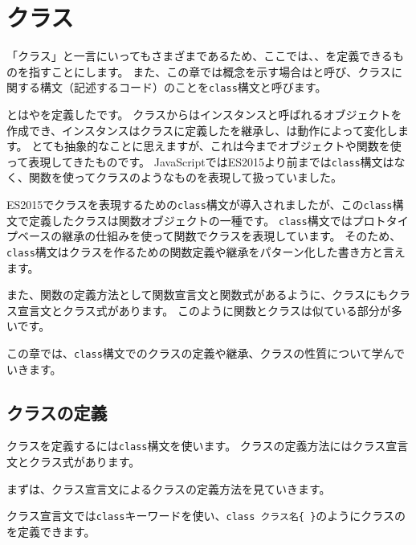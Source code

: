 \hypertarget{class}{%
\chapter{クラス}\label{class}}
\thispagestyle{frontheadings}

「クラス」と一言にいってもさまざまであるため、ここでは\textbf{}、\textbf{}、\textbf{}を定義できるものを指すことにします。
また、この章では概念を示す場合は\textbf{}と呼び、クラスに関する構文（記述するコード）のことを\texttt{class}構文と呼びます。

\textbf{}とは\textbf{}や\textbf{}を定義した\textbf{}です。
クラスからはインスタンスと呼ばれるオブジェクトを作成でき、インスタンスはクラスに定義した\textbf{}を継承し、\textbf{}は動作によって変化します。
とても抽象的なことに思えますが、これは今までオブジェクトや関数を使って表現してきたものです。
JavaScriptではES2015より前までは\texttt{class}構文はなく、関数を使ってクラスのようなものを表現して扱っていました。

ES2015でクラスを表現するための\texttt{class}構文が導入されましたが、この\texttt{class}構文で定義したクラスは関数オブジェクトの一種です。
\texttt{class}構文ではプロトタイプベースの継承の仕組みを使って関数でクラスを表現しています。
そのため、\texttt{class}構文はクラスを作るための関数定義や継承をパターン化した書き方と言えます。

また、関数の定義方法として関数宣言文と関数式があるように、クラスにもクラス宣言文とクラス式があります。
このように関数とクラスは似ている部分が多いです。

この章では、\texttt{class}構文でのクラスの定義や継承、クラスの性質について学んでいきます。

\hypertarget{class-declaration}{%
\section{クラスの定義}\label{class-declaration}}

クラスを定義するには\texttt{class}構文を使います。
クラスの定義方法にはクラス宣言文とクラス式があります。

まずは、クラス宣言文によるクラスの定義方法を見ていきます。

クラス宣言文では\texttt{class}キーワードを使い、\texttt{class クラス名\{ \}}のようにクラスの\textbf{}を定義できます。

